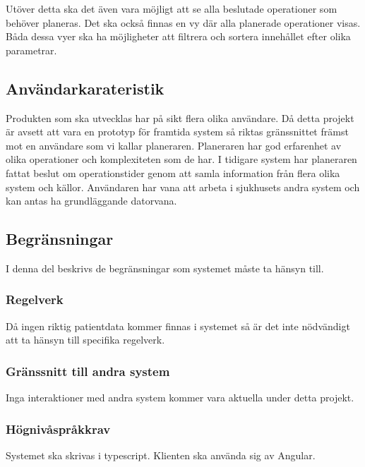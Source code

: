 \documentclass{article}
\begin{document}
Utöver detta ska det även vara möjligt att se alla beslutade operationer som
behöver planeras. Det ska också finnas en vy där alla planerade operationer
visas. Båda dessa vyer ska ha möjligheter att filtrera och sortera innehållet
efter olika parametrar.
\subsection{Användarkarateristik}
\label{subsec:Andvandarkarateristik}
Produkten som ska utvecklas har på sikt flera olika användare. Då detta
projekt är avsett att vara en prototyp för framtida system så riktas
gränssnittet
främst mot en användare som vi kallar planeraren. Planeraren har god
erfarenhet av olika operationer och komplexiteten som de har. I tidigare system
har planeraren fattat beslut om operationstider genom att samla information
från flera olika system och källor. Användaren har vana att arbeta i
sjukhusets
andra system och kan antas ha grundläggande datorvana.

\subsection{Begränsningar}
\label{subsec:Begransningar}
I denna del beskrivs de begränsningar som systemet måste ta hänsyn till.

\subsubsection{Regelverk}
\label{subsec:Regelverk}
Då ingen riktig patientdata kommer finnas i systemet så är det inte nödvändigt
att ta hänsyn till specifika regelverk.

\subsubsection{Gränssnitt till andra system}
\label{subsec:Granssnitt till andra system}
Inga interaktioner med andra system kommer vara aktuella under detta projekt.

\subsubsection{Högnivåspråkkrav}
\label{subsec:Hognivasprakkrav}
Systemet ska skrivas i typescript. Klienten ska använda sig av Angular.

\end{document}
